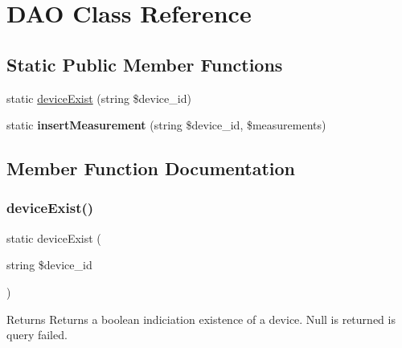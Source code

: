 \hypertarget{class_d_a_o}{}\section{D\+AO Class Reference}
\label{class_d_a_o}
\subsection*{Static Public Member Functions}
\begin{DoxyCompactItemize}
\item 
static \hyperlink{class_d_a_o_aad2161af4b52afb99e2a931538559823}{device\+Exist} (string \$device\+\_\+id)
\item 
\mbox{\label{class_d_a_o_a7eac316fa6ef9a30e916a3fa56e717bf}} 
static {\bfseries insert\+Measurement} (string \$device\+\_\+id, \$measurements)
\end{DoxyCompactItemize}


\subsection{Member Function Documentation}
\mbox{\label{class_d_a_o_aad2161af4b52afb99e2a931538559823}} 
\subsubsection{\texorpdfstring{device\+Exist()}{deviceExist()}}
{\footnotesize\ttfamily static device\+Exist (\begin{DoxyParamCaption}\item[{string}]{\$device\+\_\+id }\end{DoxyParamCaption})\hspace{0.3cm}{\ttfamily [static]}}

\begin{DoxyReturn}{Returns}
Returns a boolean indiciation existence of a device. Null is returned is query failed. 
\end{DoxyReturn}

